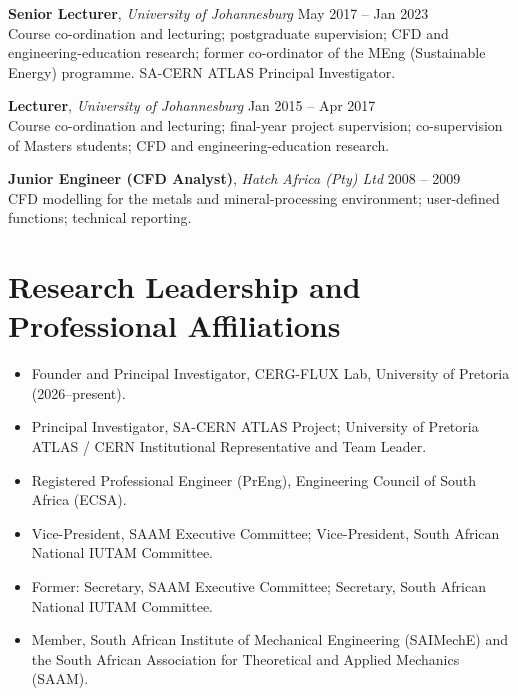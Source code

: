 \documentclass[11pt, a4paper]{article}
\begin{document}
\smallskip
\textbf{Senior Lecturer}, \textit{University of Johannesburg} \hfill May 2017 -- Jan 2023\\
Course co-ordination and lecturing; postgraduate supervision; CFD and engineering-education research; former co-ordinator of the MEng (Sustainable Energy) programme. SA-CERN ATLAS Principal Investigator.

\smallskip
\textbf{Lecturer}, \textit{University of Johannesburg} \hfill Jan 2015 -- Apr 2017\\
Course co-ordination and lecturing; final-year project supervision; co-supervision of Masters students; CFD and engineering-education research.

\smallskip
\textbf{Junior Engineer (CFD Analyst)}, \textit{Hatch Africa (Pty) Ltd} \hfill 2008 -- 2009\\
CFD modelling for the metals and mineral-processing environment; user-defined functions; technical reporting.

\section{Research Leadership and Professional Affiliations}
\begin{itemize}
  \item Founder and Principal Investigator, CERG-FLUX Lab, University of Pretoria (2026--present).
  \item Principal Investigator, SA-CERN ATLAS Project; University of Pretoria ATLAS / CERN Institutional Representative and Team Leader.
  \item Registered Professional Engineer (PrEng), Engineering Council of South Africa (ECSA).
  \item Vice-President, SAAM Executive Committee; Vice-President, South African National IUTAM Committee.
  \item Former: Secretary, SAAM Executive Committee; Secretary, South African National IUTAM Committee.
  \item Member, South African Institute of Mechanical Engineering (SAIMechE) and the South African Association for Theoretical and Applied Mechanics (SAAM).
\end{itemize}

\end{document}
